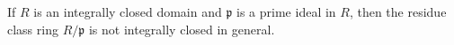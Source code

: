 If $R$ is an integrally closed domain and $\mathfrak{p}$ is a prime ideal in $R$, then the residue class ring $R/\mathfrak{p}$ is not integrally closed in general.
